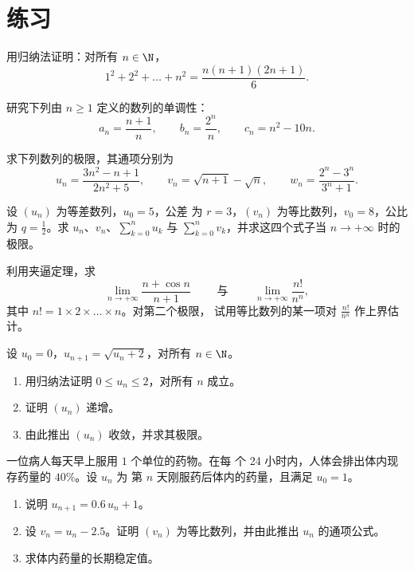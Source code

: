 \section{练习}

\begin{exercise}[$\star$]\label{exo:g12:seq:1}
用归纳法证明：对所有 $n \in \N$，
\[
1^2 + 2^2 + \dots + n^2 = \frac{n(n+1)(2n+1)}{6}.
\]
\end{exercise}

\begin{exercise}[$\star$]\label{exo:g12:seq:2}
研究下列由 $n \geq 1$ 定义的数列的单调性：
\[
a_n = \frac{n+1}{n}, \qquad
b_n = \frac{2^n}{n}, \qquad
c_n = n^2 - 10n .
\]
\end{exercise}

\begin{exercise}[$\star$]\label{exo:g12:seq:3}
求下列数列的极限，其通项分别为
\[
u_n = \frac{3n^2 - n + 1}{2n^2 + 5}, \qquad
v_n = \sqrt{n+1} - \sqrt{n}, \qquad
w_n = \frac{2^n - 3^n}{3^n + 1}.
\]
\end{exercise}

\begin{exercise}[$\star$]\label{exo:g12:seq:4}
设 $(u_n)$ 为等差数列，$u_0 = 5$，公差
为 $r = 3$，$(v_n)$ 为等比数列，$v_0 = 8$，公比
为 $q = \frac{1}{2}$。求 $u_n$、$v_n$、$\sum_{k=0}^{n} u_k$ 与
$\sum_{k=0}^{n} v_k$，并求这四个式子当
$n \to +\infty$ 时的极限。
\end{exercise}

\begin{exercise}[$\star\star$]\label{exo:g12:seq:5}
利用夹逼定理，求
\[
\lim_{n\to+\infty} \frac{n + \cos n}{n + 1}
\qquad\text{ 与 }\qquad
\lim_{n\to+\infty} \frac{n!}{n^n},
\]
其中 $n! = 1 \times 2 \times \dots \times n$。对第二个极限，
试用等比数列的某一项对 $\frac{n!}{n^n}$ 作上界估计。
\end{exercise}

\begin{exercise}[$\star\star$]\label{exo:g12:seq:6}
设 $u_0 = 0$，$u_{n+1} = \sqrt{u_n + 2}$，对所有 $n \in \N$。
\begin{enumerate}
  \item 用归纳法证明 $0 \leq u_n \leq 2$，对所有 $n$ 成立。
  \item 证明 $(u_n)$ 递增。
  \item 由此推出 $(u_n)$ 收敛，并求其极限。
\end{enumerate}
\end{exercise}

\begin{exercise}[$\star\star$]\label{exo:g12:seq:7}
一位病人每天早上服用 $1$ 个单位的药物。在每
个 24 小时内，人体会排出体内现存药量的 $40\%$。设 $u_n$ 为
第 $n$ 天刚服药后体内的药量，且满足
$u_0 = 1$。
\begin{enumerate}
  \item 说明 $u_{n+1} = 0.6\,u_n + 1$。
  \item 设 $v_n = u_n - 2.5$。证明 $(v_n)$ 为等比数列，并由此推出
        $u_n$ 的通项公式。
  \item 求体内药量的长期稳定值。
\end{enumerate}
\end{exercise}

